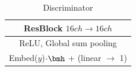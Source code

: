 \begin{table}[ht]
\begin{subtable}{.4\textwidth}
{\begin{tabular}{c}
                  \midrule
                  ResBlock $16ch \rightarrow 16ch$\\
                  \midrule
                  ReLU, Global sum pooling\\
                  \midrule
                  Embed($y$)$\cdot \bmh$ + (linear $\rightarrow$ 1) \\
                  \midrule
                  \bottomrule
              \end{tabular}}
              \caption{\label{tab:deep_dis_resnet_imagenet_512} Discriminator}
          \end{subtable}
\end{table}


\clearpage
